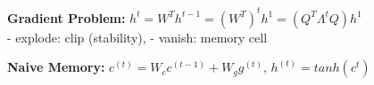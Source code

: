 \textbf{Gradient Problem:} $h^t = W^T h^{t-1} = (W^T)^t h^1 = (Q^T \Lambda^t Q) h^1$\\
- explode: clip (stability), - vanish: memory cell\\

\textbf{Naive Memory:} $c^{(t)} = W_c c^{(t-1)} + W_g g^{(t)}$, $h^{(t)} = tanh(c^t)$\\

